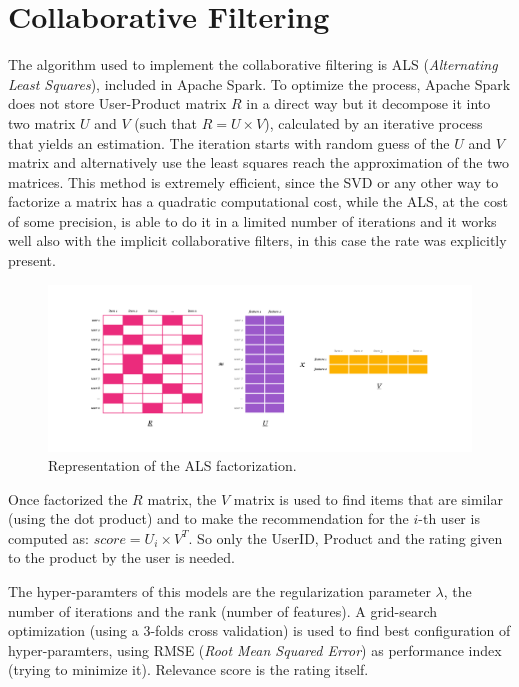 \documentclass[fleqn,10pt]{SelfArx}
\begin{document}
\section{Collaborative Filtering}
The algorithm used to implement the collaborative filtering is ALS (\textit{Alternating Least Squares}), included in Apache Spark.
To optimize the process, Apache Spark does not store User-Product matrix $R$ in a direct way but it decompose it into two matrix $U$ and $V$ (such that $R = U \times V$), calculated by an iterative process that yields an estimation.
The iteration starts with random guess of the $U$ and $V$ matrix and alternatively use the least squares reach the approximation of the two matrices.
This method is extremely efficient, since the SVD or any other way to factorize a matrix has a quadratic computational cost, while the ALS, at the cost of some precision, is able to do it in a limited number of iterations and it works well also with the implicit collaborative filters, in this case the rate was explicitly present.
\begin{figure}[!h]
    \includegraphics[width=\linewidth]{als.png}
    \caption{Representation of the ALS factorization.}
    \label{fig:als}
\end{figure}

Once factorized the $R$ matrix, the $V$ matrix is used to find items that are similar (using the dot product) and to make the recommendation for the $i$-th user is computed as: $score = U_i \times V^T$.
So only the UserID, Product and the rating given to the product by the user is needed.

The hyper-paramters of this models are the regularization parameter $\lambda$, the number of iterations and the rank (number of features).
A grid-search optimization (using a 3-folds cross validation) is used to find best configuration of hyper-paramters, using RMSE (\textit{Root Mean Squared Error}) as performance index (trying to minimize it).
Relevance score is the rating itself.
\end{document}
